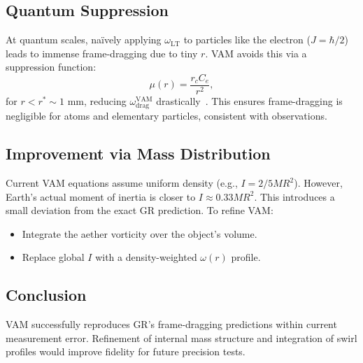 \subsection*{Quantum Suppression}
At quantum scales, naïvely applying $\omega_{\text{LT}}$ to particles like the electron ($J = \hbar/2$) leads to immense frame-dragging due to tiny $r$. VAM avoids this via a suppression function:
\[
    \mu(r) = \frac{r_c C_e}{r^2},
\]
for $r < r^* \sim 1$ mm, reducing $\omega^{\text{VAM}}_{\text{drag}}$ drastically~\cite{iskandarani2025VAM2}. This ensures frame-dragging is negligible for atoms and elementary particles, consistent with observations.

\subsection*{Improvement via Mass Distribution}
Current VAM equations assume uniform density (e.g., $I = 2/5MR^2$). However, Earth’s actual moment of inertia is closer to $I \approx 0.33MR^2$. This introduces a small deviation from the exact GR prediction. To refine VAM:
\begin{itemize}
    \item Integrate the aether vorticity over the object’s volume.
    \item Replace global $I$ with a density-weighted $\omega(r)$ profile.
\end{itemize}

\subsection*{Conclusion}
VAM successfully reproduces GR’s frame-dragging predictions within current measurement error. Refinement of internal mass structure and integration of swirl profiles would improve fidelity for future precision tests.